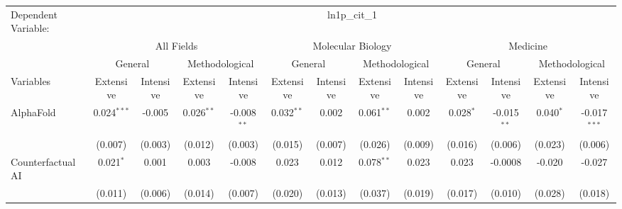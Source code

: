 \begingroup
\centering
\begin{tabular}{lcccccccccccc}
   \tabularnewline \midrule \midrule
   Dependent Variable: & \multicolumn{12}{c}{ln1p\_cit\_1}\\
 & \multicolumn{4}{c}{All Fields} & \multicolumn{4}{c}{Molecular Biology} & \multicolumn{4}{c}{Medicine} \\
\cmidrule(lr){2-5} \cmidrule(lr){6-9} \cmidrule(lr){10-13}
 & \multicolumn{2}{c}{General} & \multicolumn{2}{c}{Methodological} & \multicolumn{2}{c}{General} & \multicolumn{2}{c}{Methodological} & \multicolumn{2}{c}{General} & \multicolumn{2}{c}{Methodological} \\
\cmidrule(lr){2-3} \cmidrule(lr){4-5} \cmidrule(lr){6-7} \cmidrule(lr){8-9} \cmidrule(lr){10-11} \cmidrule(lr){12-13}
Variables & \multicolumn{1}{c}{Extensive} & \multicolumn{1}{c}{Intensive} & \multicolumn{1}{c}{Extensive} & \multicolumn{1}{c}{Intensive} & \multicolumn{1}{c}{Extensive} & \multicolumn{1}{c}{Intensive} & \multicolumn{1}{c}{Extensive} & \multicolumn{1}{c}{Intensive} & \multicolumn{1}{c}{Extensive} & \multicolumn{1}{c}{Intensive} & \multicolumn{1}{c}{Extensive} & \multicolumn{1}{c}{Intensive} \\
\cmidrule(lr){1-1}\cmidrule(lr){2-2} \cmidrule(lr){3-3} \cmidrule(lr){4-4} \cmidrule(lr){5-5} \cmidrule(lr){6-6} \cmidrule(lr){7-7} \cmidrule(lr){8-8} \cmidrule(lr){9-9} \cmidrule(lr){10-10} \cmidrule(lr){11-11} \cmidrule(lr){12-12} \cmidrule(lr){13-13}
   AlphaFold                                & 0.024$^{***}$  & -0.005       & 0.026$^{**}$  & -0.008$^{**}$ & 0.032$^{**}$ & 0.002          & 0.061$^{**}$  & 0.002          & 0.028$^{*}$    & -0.015$^{**}$ & 0.040$^{*}$    & -0.017$^{***}$\\   
                                            & (0.007)        & (0.003)      & (0.012)       & (0.003)       & (0.015)      & (0.007)        & (0.026)       & (0.009)        & (0.016)        & (0.006)       & (0.023)        & (0.006)\\   
   Counterfactual AI                        & 0.021$^{*}$    & 0.001        & 0.003         & -0.008        & 0.023        & 0.012          & 0.078$^{**}$  & 0.023          & 0.023          & -0.0008       & -0.020         & -0.027\\   
                                            & (0.011)        & (0.006)      & (0.014)       & (0.007)       & (0.020)      & (0.013)        & (0.037)       & (0.019)        & (0.017)        & (0.010)       & (0.028)        & (0.018)\\   

\end{tabular}
